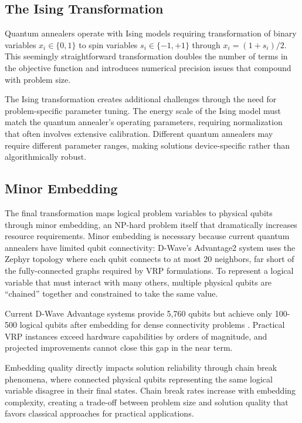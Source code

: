 \documentclass[preprint,3p,12pt,authoryear]{elsarticle}
\begin{document}
\subsection{The Ising Transformation}

Quantum annealers operate with Ising models requiring transformation of binary variables $x_i \in \{0,1\}$ to spin variables $s_i \in \{-1,+1\}$ through $x_i = (1+s_i)/2$. This seemingly straightforward transformation doubles the number of terms in the objective function and introduces numerical precision issues that compound with problem size.

The Ising transformation creates additional challenges through the need for problem-specific parameter tuning. The energy scale of the Ising model must match the quantum annealer's operating parameters, requiring normalization that often involves extensive calibration. Different quantum annealers may require different parameter ranges, making solutions device-specific rather than algorithmically robust.

\subsection{Minor Embedding}

The final transformation maps logical problem variables to physical qubits through minor embedding, an NP-hard problem itself \citep{choi2008minor} that dramatically increases resource requirements. Minor embedding is necessary because current quantum annealers have limited qubit connectivity: D-Wave's Advantage2 system uses the Zephyr topology where each qubit connects to at most 20 neighbors, far short of the fully-connected graphs required by VRP formulations. To represent a logical variable that must interact with many others, multiple physical qubits are ``chained'' together and constrained to take the same value.

Current D-Wave Advantage systems provide 5,760 qubits but achieve only 100-500 logical qubits after embedding for dense connectivity problems \citep{e25030541}. Practical VRP instances exceed hardware capabilities by orders of magnitude, and projected improvements cannot close this gap in the near term.

Embedding quality directly impacts solution reliability through chain break phenomena, where connected physical qubits representing the same logical variable disagree in their final states. Chain break rates increase with embedding complexity, creating a trade-off between problem size and solution quality that favors classical approaches for practical applications.
\end{document}
